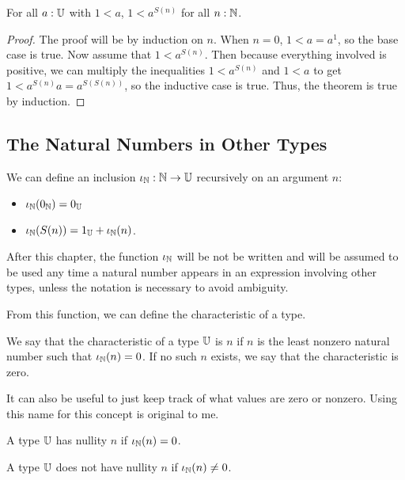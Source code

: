 \documentclass[../math.tex]{subfiles}
\begin{document}
\begin{theorem} \label{nat_pow_lt_one}
    For all $a : \mathbb{U}$ with $1 < a$, $1 < a^{S(n)}$ for all $n : \mathbb{N}$.
\end{theorem}
\begin{proof}
    The proof will be by induction on $n$.  When $n = 0$, $1 < a = a^1$, so the
    base case is true.  Now assume that $1 < a^{S(n)}$.  Then because everything
    involved is positive, we can multiply the inequalities $1 < a^{S(n)}$ and $1
    < a$ to get $1 < a^{S(n)}a = a^{S(S(n))}$, so the inductive case is true.
    Thus, the theorem is true by induction.
\end{proof}

\subsection{The Natural Numbers in Other Types}

\begin{definition}
    We can define an inclusion $\iota_{\mathbb{N}} : \mathbb{N} \rightarrow \mathbb{U}$ recursively on an
    argument $n$:
    \begin{itemize}
        \item $\iota_{\mathbb{N}}(0_{\mathbb{N}}) = 0_{\mathbb{U}}$
        \item $\iota_{\mathbb{N}}(S(n)) = 1_{\mathbb{U}} + \iota_{\mathbb{N}}(n)$.
    \end{itemize}
    After this chapter, the function $\iota_{\mathbb{N}}$ will be not be written and will
    be assumed to be used any time a natural number appears in an expression
    involving other types, unless the notation is necessary to avoid ambiguity.
\end{definition}

From this function, we can define the characteristic of a type.

\begin{class}
    We say that the characteristic of a type $\mathbb{U}$ is $n$ if $n$ is the least
    nonzero natural number such that $\iota_{\mathbb{N}}(n) = 0$.  If no such $n$ exists,
    we say that the characteristic is zero.
\end{class}

It can also be useful to just keep track of what values are zero or nonzero.
Using this name for this concept is original to me.

\begin{class}
    A type $\mathbb{U}$ has nullity $n$ if $\iota_{\mathbb{N}}(n) = 0$.
\end{class}
\begin{class}
    A type $\mathbb{U}$ does not have nullity $n$ if $\iota_{\mathbb{N}}(n) \neq 0$.
\end{class}
\end{document}

